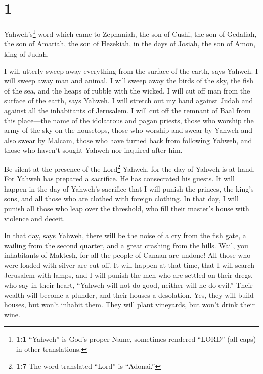 \hypertarget{section}{%
\section{1}\label{section}}

 Yahweh's\footnote{\textbf{1:1} ``Yahweh'' is God's proper
  Name, sometimes rendered ``LORD'' (all caps) in other translations.}
word which came to Zephaniah, the son of Cushi, the son of Gedaliah, the
son of Amariah, the son of Hezekiah, in the days of Josiah, the son of
Amon, king of Judah.

 I will utterly sweep away everything from the surface of
the earth, says Yahweh.  I will sweep away man and animal.
I will sweep away the birds of the sky, the fish of the sea, and the
heaps of rubble with the wicked. I will cut off man from the surface of
the earth, says Yahweh.  I will stretch out my hand
against Judah and against all the inhabitants of Jerusalem. I will cut
off the remnant of Baal from this place---the name of the idolatrous and
pagan priests,  those who worship the army of the sky on
the housetops, those who worship and swear by Yahweh and also swear by
Malcam,  those who have turned back from following Yahweh,
and those who haven't sought Yahweh nor inquired after him.

 Be silent at the presence of the Lord\footnote{\textbf{1:7}
  The word translated ``Lord'' is ``Adonai.''} Yahweh, for the day of
Yahweh is at hand. For Yahweh has prepared a sacrifice. He has
consecrated his guests.  It will happen in the day of
Yahweh's sacrifice that I will punish the princes, the king's sons, and
all those who are clothed with foreign clothing.  In that
day, I will punish all those who leap over the threshold, who fill their
master's house with violence and deceit.

 In that day, says Yahweh, there will be the noise of a
cry from the fish gate, a wailing from the second quarter, and a great
crashing from the hills.  Wail, you inhabitants of
Maktesh, for all the people of Canaan are undone! All those who were
loaded with silver are cut off.  It will happen at that
time, that I will search Jerusalem with lamps, and I will punish the men
who are settled on their dregs, who say in their heart, ``Yahweh will
not do good, neither will he do evil.''  Their wealth
will become a plunder, and their houses a desolation. Yes, they will
build houses, but won't inhabit them. They will plant vineyards, but
won't drink their wine.

